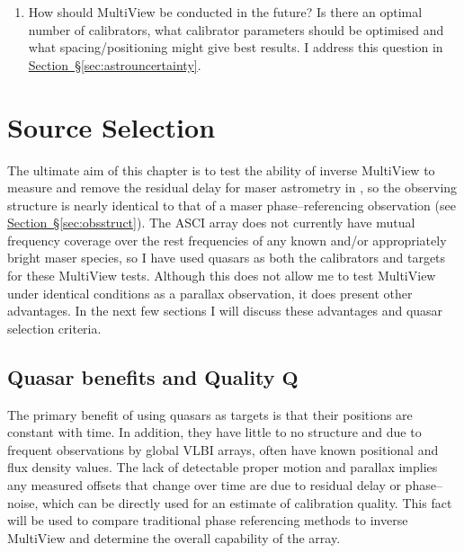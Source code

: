 \begin{enumerate}
		\item How should MultiView be conducted in the future? Is there an optimal number of calibrators, what calibrator parameters should be optimised and what spacing/positioning might give best results.  I address this question in \hyperref[sec:astrouncertainty]{Section~\S\ref*{sec:astrouncertainty}}.
	\end{enumerate} %

\section{Source Selection}
    The ultimate aim of this chapter is to test the ability of inverse MultiView to measure and remove the residual delay for maser astrometry in \spirals, so the observing structure is nearly identical to that of a maser phase--referencing observation (see \hyperref[sec:obsstruct]{Section~\S\ref*{sec:obsstruct}}). The ASCI array does not currently have mutual frequency coverage over the rest frequencies of any known and/or appropriately bright maser species, so I have used quasars as both the calibrators and targets for these MultiView tests. Although this does not allow me to test MultiView under identical conditions as a parallax observation, it does present other advantages. In the next few sections I will discuss these advantages and quasar selection criteria.
    
    \subsection{Quasar benefits and Quality $\boldsymbol{Q}$}
    	The primary benefit of using quasars as targets is that their positions are constant with time. In addition, they have little to no structure and due to frequent observations by global VLBI arrays, often have known positional and flux density values. The lack of detectable proper motion and parallax implies any measured offsets that change over time are due to residual delay or phase--noise, which can be directly used for an estimate of calibration quality. This fact will be used to compare traditional phase referencing methods to inverse MultiView and determine the overall capability of the array.
    	
